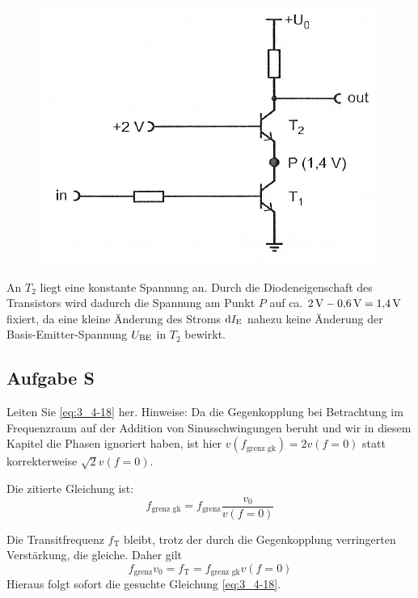 \begin{figure}[htbp]
    \centering
    \includegraphics[width=.6\textwidth]{Anleitung/3_4-15.png}
    \caption{%
        \cite[Abbildung~3/4.15]{physik313-Anleitung}
    }
    \label{fig:3_4-15}
\end{figure}

An $T_2$ liegt eine konstante Spannung an. Durch die Diodeneigenschaft des
Transistors wird dadurch die Spannung am Punkt $P$ auf ca. $\SI 2{\volt} -
\SI{0.6}{\volt} = \SI{1.4}{\volt}$ fixiert, da eine kleine Änderung des Stroms
$\dif\IE$ nahezu keine Änderung der Basis-Emitter-Spannung $U_\text{BE}$ in $T_2$
bewirkt.


\FloatBarrier
\subsection{Aufgabe S}

\begin{problem}
    Leiten Sie \eqref{eq:3_4-18} her. Hinweise: Da die Gegenkopplung bei
    Betrachtung im Frequenzraum auf der Addition von Sinusschwingungen beruht
    und wir in diesem Kapitel die Phasen ignoriert haben, ist hier
    $v(f_\text{grenz gk}) = 2v(f=0)$ statt korrekterweise $\sqrt 2 v (f = 0)$.
\end{problem}

Die zitierte Gleichung ist:
\begin{equation}
    \label{eq:3_4-18}
    f_\text{grenz gk} = f_\text{grenz} \frac{v_0}{v(f=0)}
\end{equation}

Die Transitfrequenz $f_\text{T}$ bleibt, trotz der durch die Gegenkopplung
verringerten Verstärkung, die gleiche. Daher gilt
\[f_\text{grenz}v_0 = f_\text{T} = f_\text{grenz gk} v(f=0)\]
Hieraus folgt sofort die gesuchte Gleichung \eqref{eq:3_4-18}.

